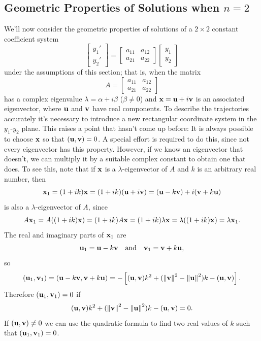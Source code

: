 \documentclass{ximera}
\begin{document}
\subsection*{Geometric Properties of Solutions when  $n=2$}

We'll now  consider the geometric properties of solutions of a
$2\times2$ constant coefficient system
\begin{equation} \label{eq:10.6.10}
\begin{bmatrix}y_1'\\y_2'\end{bmatrix}=\begin{bmatrix}a_{11}&a_{12}\\a_{21}&a_{22}
\end{bmatrix}\begin{bmatrix}y_1\\y_2\end{bmatrix}
\end{equation}
under the assumptions of this section; that is, when the matrix
$$
A=\begin{bmatrix}a_{11}&a_{12}\\a_{21}&a_{22}
\end{bmatrix}
$$
has a complex eigenvalue $\lambda=\alpha+i\beta$
($\beta\neq 0$) and ${\bf x}={\bf u}+i{\bf v}$ is an
associated eigenvector, where ${\bf u}$ and ${\bf v}$ have real
components. To describe the trajectories accurately it's necessary to
introduce a new rectangular coordinate system in the $y_1$-$y_2$
plane. This raises a point that hasn't come up before: It is always
possible to choose ${\bf x}$ so that $({\bf u},{\bf v})=0$. A special
effort is required to do this, since not every eigenvector has this
property. However, if we know an eigenvector that doesn't, we can
multiply it by a suitable complex constant to obtain one that does. To
see this, note that if ${\bf x}$ is a $\lambda$-eigenvector of $A$ and
$k$ is an arbitrary real number, then
$$
{\bf x}_1=(1+ik){\bf x}=(1+ik)({\bf u}+i{\bf v})
=({\bf u}-k{\bf v})+i({\bf v}+k{\bf u})
$$
is also a $\lambda$-eigenvector of $A$, since
$$
A{\bf x}_1= A((1+ik){\bf x})=(1+ik)A{\bf x}=(1+ik)\lambda{\bf x}=
\lambda((1+ik){\bf x})=\lambda{\bf x}_1.
$$
The real and imaginary parts of ${\bf x}_1$ are
\begin{equation} \label{eq:10.6.11}
{\bf u}_1={\bf u}-k{\bf v} \quad\mbox{and}\quad
{\bf v}_1={\bf v}+k{\bf u},
\end{equation}
so
$$
({\bf u}_1,{\bf v}_1)=({\bf u}-k{\bf v},{\bf v}+k{\bf u})
=-\left[({\bf u},{\bf v})k^2+(\left\lVert{\bf v}\right\rVert^2-\left\lVert{\bf u}\right\rVert^2)k
-({\bf u},{\bf v})\right].
$$
Therefore $({\bf u}_1,{\bf v}_1)=0$ if
\begin{equation} \label{eq:10.6.12}
({\bf u},{\bf v})k^2+(\left\lVert{\bf v}\right\rVert^2-\left\lVert{\bf u}\right\rVert^2)k-({\bf u},{\bf
v})=0.
\end{equation}
If $({\bf u},{\bf v})\ne0$ we can use the quadratic formula to find
two real values of $k$ such that $({\bf u}_1,{\bf v}_1)=0$.
\end{document}
